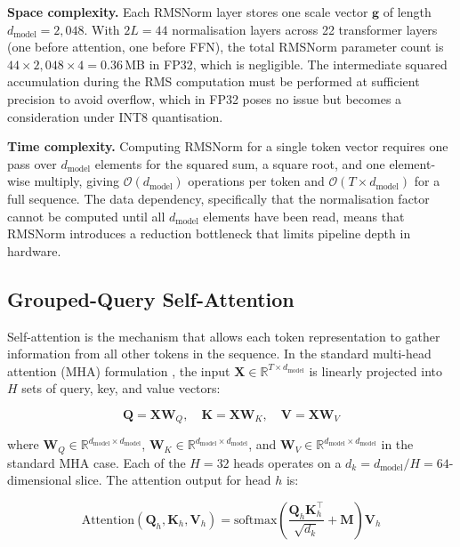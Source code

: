 \noindent\textbf{Space complexity.} Each RMSNorm layer stores one scale
vector $\mathbf{g}$ of length $d_{\text{model}} = 2{,}048$. With $2L = 44$
normalisation layers across 22 transformer layers (one before attention,
one before FFN), the total RMSNorm parameter count is
$44 \times 2{,}048 \times 4 = 0.36$\,MB in FP32, which is negligible. The
intermediate squared accumulation during the RMS computation must be
performed at sufficient precision to avoid overflow, which in FP32 poses no
issue but becomes a consideration under INT8 quantisation.

\noindent\textbf{Time complexity.} Computing RMSNorm for a single token
vector requires one pass over $d_{\text{model}}$ elements for the squared
sum, a square root, and one element-wise multiply, giving
$\mathcal{O}(d_{\text{model}})$ operations per token and
$\mathcal{O}(T \times d_{\text{model}})$ for a full sequence. The data dependency, specifically that the normalisation factor cannot be
computed until all $d_{\text{model}}$ elements have been read, means that
RMSNorm introduces a
reduction bottleneck that limits pipeline depth in hardware.


\subsection{Grouped-Query Self-Attention}
\label{subsec:gqa}

Self-attention is the mechanism that allows each token representation to
gather information from all other tokens in the sequence. In the standard
multi-head attention (MHA) formulation \cite{vaswani2017attention}, the input
$\mathbf{X} \in \mathbb{R}^{T \times d_{\text{model}}}$ is linearly
projected into $H$ sets of query, key, and value vectors:

\begin{equation}
  \mathbf{Q} = \mathbf{X}\mathbf{W}_Q, \quad
  \mathbf{K} = \mathbf{X}\mathbf{W}_K, \quad
  \mathbf{V} = \mathbf{X}\mathbf{W}_V
  \label{eq:qkv_proj}
\end{equation}

\noindent where $\mathbf{W}_Q \in \mathbb{R}^{d_{\text{model}} \times
d_{\text{model}}}$, $\mathbf{W}_K \in \mathbb{R}^{d_{\text{model}} \times
d_{\text{model}}}$, and $\mathbf{W}_V \in \mathbb{R}^{d_{\text{model}}
\times d_{\text{model}}}$ in the standard MHA case. Each of the $H = 32$
heads operates on a $d_k = d_{\text{model}} / H = 64$-dimensional slice.
The attention output for head $h$ is:

\begin{equation}
  \text{Attention}(\mathbf{Q}_h, \mathbf{K}_h, \mathbf{V}_h)
  = \text{softmax}\!\left(
      \frac{\mathbf{Q}_h \mathbf{K}_h^\top}{\sqrt{d_k}}
      + \mathbf{M}
    \right) \mathbf{V}_h
  \label{eq:attention}
\end{equation}

